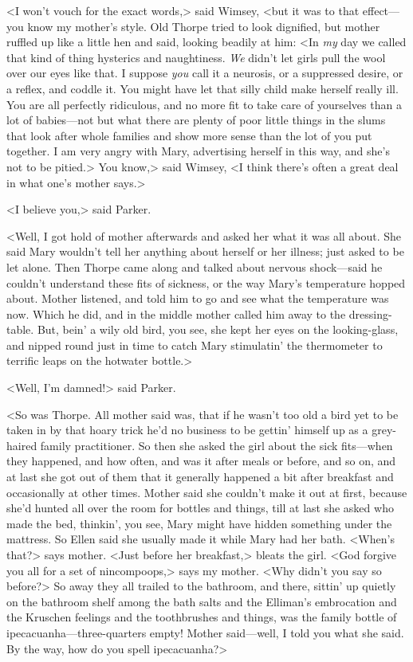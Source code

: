 <I won't vouch for the exact words,> said Wimsey, <but it was to that effect—you know my mother's style. Old Thorpe tried to look dignified, but mother ruffled up like a little hen and said, looking beadily at him: <In \emph{my} day we called that kind of thing hysterics and naughtiness. \emph{We} didn't let girls pull the wool over our eyes like that. I suppose \emph{you} call it a neurosis, or a suppressed desire, or a reflex, and coddle it. You might have let that silly child make herself really ill. You are all perfectly ridiculous, and no more fit to take care of yourselves than a lot of babies—not but what there are plenty of poor little things in the slums that look after whole families and show more sense than the lot of you put together. I am very angry with Mary, advertising herself in this way, and she's not to be pitied.> You know,> said Wimsey, <I think there's often a great deal in what one's mother says.>

<I believe you,> said Parker.

<Well, I got hold of mother afterwards and asked her what it was all about. She said Mary wouldn't tell her anything about herself or her illness; just asked to be let alone. Then Thorpe came along and talked about nervous shock—said he couldn't understand these fits of sickness, or the way Mary's temperature hopped about. Mother listened, and told him to go and see what the temperature was now. Which he did, and in the middle mother called him away to the dressing-table. But, bein' a wily old bird, you see, she kept her eyes on the looking-glass, and nipped round just in time to catch Mary stimulatin' the thermometer to terrific leaps on the hotwater bottle.>

<Well, I'm damned!> said Parker.

<So was Thorpe. All mother said was, that if he wasn't too old a bird yet to be taken in by that hoary trick he'd no business to be gettin' himself up as a grey-haired family practitioner. So then she asked the girl about the sick fits—when they happened, and how often, and was it after meals or before, and so on, and at last she got out of them that it generally happened a bit after breakfast and occasionally at other times. Mother said she couldn't make it out at first, because she'd hunted all over the room for bottles and things, till at last she asked who made the bed, thinkin', you see, Mary might have hidden something under the mattress. So Ellen said she usually made it while Mary had her bath. <When's that?> says mother. <Just before her breakfast,> bleats the girl. <God forgive you all for a set of nincompoops,> says my mother. <Why didn't you say so before?> So away they all trailed to the bathroom, and there, sittin' up quietly on the bathroom shelf among the bath salts and the Elliman's embrocation and the Kruschen feelings and the toothbrushes and things, was the family bottle of ipecacuanha—three-quarters empty! Mother said—well, I told you what she said. By the way, how do you spell ipecacuanha?>

